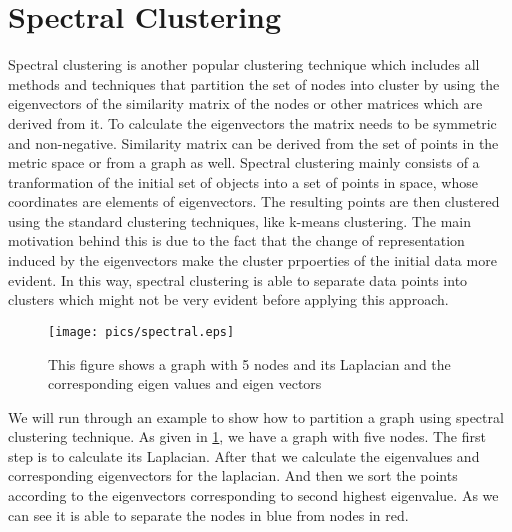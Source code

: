 \documentclass[letterpaper]{article}
\begin{document}
\section{Spectral Clustering} 
Spectral clustering is another popular clustering technique which includes all
methods and techniques that partition the set of nodes into cluster by using
the eigenvectors of the similarity matrix of the nodes or other matrices which
are derived from it. To calculate the eigenvectors the matrix needs to be
symmetric and non-negative. Similarity matrix can be derived from the set of
points in the metric space or from a graph as well. Spectral clustering mainly
consists of a tranformation of the initial set of objects into a set of points
in space, whose coordinates are elements of eigenvectors. The resulting points
are then clustered using the standard clustering techniques, like k-means
clustering. The main motivation behind this is due to the fact that the 
change of representation induced by the eigenvectors make the cluster
prpoerties of the initial data more evident. In this way, spectral clustering
is able to separate data points into clusters which might not be very evident
before applying this approach. 

\begin{figure}
\texttt{[image: pics/spectral.eps]}
\caption{This figure shows a graph with 5 nodes and its Laplacian and the
corresponding eigen values and eigen vectors} \label{fig:spectral}
\end{figure}

We will run through an example to show how to partition a graph using spectral
clustering technique.  As given in \ref{fig:spectral}, we have a graph with
five nodes. The first step is to calculate its Laplacian. After that we
calculate the eigenvalues and corresponding eigenvectors for the laplacian. And
then we sort the points according to the eigenvectors corresponding to second
highest eigenvalue. As we can see it is able to separate the nodes in blue from
nodes in red.
\end{document}

